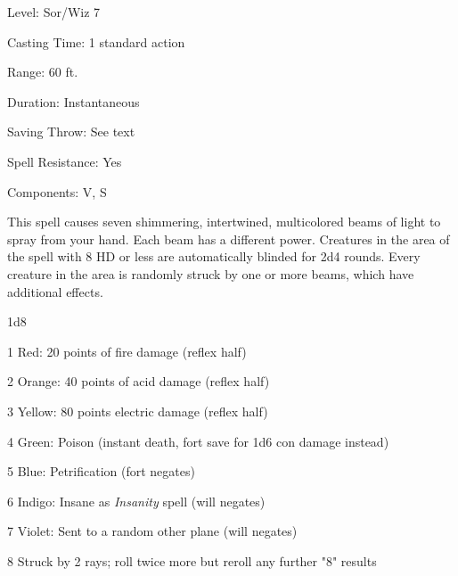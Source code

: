 
\begin{description*}
\item[Level:] Sor/Wiz 7
\item[Casting Time:] 1 standard action
\item[Range:] 60 ft.
\item[Duration:] Instantaneous
\item[Saving Throw:] See text
\item[Spell Resistance:] Yes
\item[Components:] V, S
\end{description*}

This spell causes seven shimmering, intertwined, multicolored beams of light to
spray from your hand. Each beam has a different power. Creatures in the area of
the spell with 8 HD or less are automatically blinded for 2d4 rounds. Every creature
in the area is randomly struck by one or more beams, which have additional effects.
\begin{description*}
\item[1d8]
\item[1] Red: 20 points of fire damage (reflex half)
\item[2] Orange: 40 points of acid damage (reflex half)
\item[3] Yellow: 80 points electric damage (reflex half)
\item[4] Green: Poison (instant death, fort save for 1d6 con damage instead)
\item[5] Blue: Petrification (fort negates)
\item[6] Indigo: Insane as \textit{Insanity} spell (will negates)
\item[7] Violet: Sent to a random other plane (will negates)
\item[8] Struck by 2 rays; roll twice more but reroll any further "8" results
\end{description*}